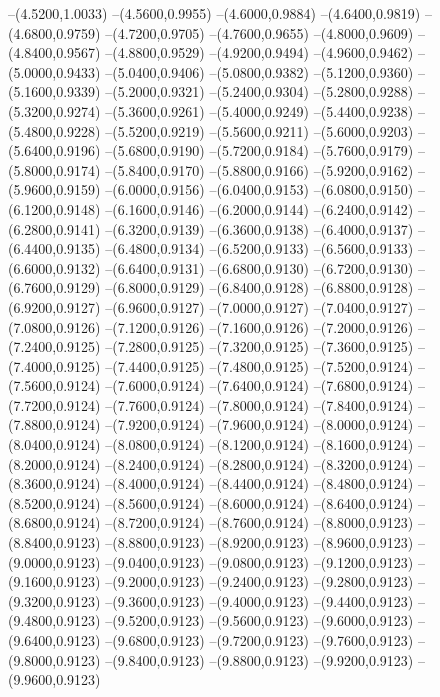 {	--(4.5200,1.0033)
	--(4.5600,0.9955)
	--(4.6000,0.9884)
	--(4.6400,0.9819)
	--(4.6800,0.9759)
	--(4.7200,0.9705)
	--(4.7600,0.9655)
	--(4.8000,0.9609)
	--(4.8400,0.9567)
	--(4.8800,0.9529)
	--(4.9200,0.9494)
	--(4.9600,0.9462)
	--(5.0000,0.9433)
	--(5.0400,0.9406)
	--(5.0800,0.9382)
	--(5.1200,0.9360)
	--(5.1600,0.9339)
	--(5.2000,0.9321)
	--(5.2400,0.9304)
	--(5.2800,0.9288)
	--(5.3200,0.9274)
	--(5.3600,0.9261)
	--(5.4000,0.9249)
	--(5.4400,0.9238)
	--(5.4800,0.9228)
	--(5.5200,0.9219)
	--(5.5600,0.9211)
	--(5.6000,0.9203)
	--(5.6400,0.9196)
	--(5.6800,0.9190)
	--(5.7200,0.9184)
	--(5.7600,0.9179)
	--(5.8000,0.9174)
	--(5.8400,0.9170)
	--(5.8800,0.9166)
	--(5.9200,0.9162)
	--(5.9600,0.9159)
	--(6.0000,0.9156)
	--(6.0400,0.9153)
	--(6.0800,0.9150)
	--(6.1200,0.9148)
	--(6.1600,0.9146)
	--(6.2000,0.9144)
	--(6.2400,0.9142)
	--(6.2800,0.9141)
	--(6.3200,0.9139)
	--(6.3600,0.9138)
	--(6.4000,0.9137)
	--(6.4400,0.9135)
	--(6.4800,0.9134)
	--(6.5200,0.9133)
	--(6.5600,0.9133)
	--(6.6000,0.9132)
	--(6.6400,0.9131)
	--(6.6800,0.9130)
	--(6.7200,0.9130)
	--(6.7600,0.9129)
	--(6.8000,0.9129)
	--(6.8400,0.9128)
	--(6.8800,0.9128)
	--(6.9200,0.9127)
	--(6.9600,0.9127)
	--(7.0000,0.9127)
	--(7.0400,0.9127)
	--(7.0800,0.9126)
	--(7.1200,0.9126)
	--(7.1600,0.9126)
	--(7.2000,0.9126)
	--(7.2400,0.9125)
	--(7.2800,0.9125)
	--(7.3200,0.9125)
	--(7.3600,0.9125)
	--(7.4000,0.9125)
	--(7.4400,0.9125)
	--(7.4800,0.9125)
	--(7.5200,0.9124)
	--(7.5600,0.9124)
	--(7.6000,0.9124)
	--(7.6400,0.9124)
	--(7.6800,0.9124)
	--(7.7200,0.9124)
	--(7.7600,0.9124)
	--(7.8000,0.9124)
	--(7.8400,0.9124)
	--(7.8800,0.9124)
	--(7.9200,0.9124)
	--(7.9600,0.9124)
	--(8.0000,0.9124)
	--(8.0400,0.9124)
	--(8.0800,0.9124)
	--(8.1200,0.9124)
	--(8.1600,0.9124)
	--(8.2000,0.9124)
	--(8.2400,0.9124)
	--(8.2800,0.9124)
	--(8.3200,0.9124)
	--(8.3600,0.9124)
	--(8.4000,0.9124)
	--(8.4400,0.9124)
	--(8.4800,0.9124)
	--(8.5200,0.9124)
	--(8.5600,0.9124)
	--(8.6000,0.9124)
	--(8.6400,0.9124)
	--(8.6800,0.9124)
	--(8.7200,0.9124)
	--(8.7600,0.9124)
	--(8.8000,0.9123)
	--(8.8400,0.9123)
	--(8.8800,0.9123)
	--(8.9200,0.9123)
	--(8.9600,0.9123)
	--(9.0000,0.9123)
	--(9.0400,0.9123)
	--(9.0800,0.9123)
	--(9.1200,0.9123)
	--(9.1600,0.9123)
	--(9.2000,0.9123)
	--(9.2400,0.9123)
	--(9.2800,0.9123)
	--(9.3200,0.9123)
	--(9.3600,0.9123)
	--(9.4000,0.9123)
	--(9.4400,0.9123)
	--(9.4800,0.9123)
	--(9.5200,0.9123)
	--(9.5600,0.9123)
	--(9.6000,0.9123)
	--(9.6400,0.9123)
	--(9.6800,0.9123)
	--(9.7200,0.9123)
	--(9.7600,0.9123)
	--(9.8000,0.9123)
	--(9.8400,0.9123)
	--(9.8800,0.9123)
	--(9.9200,0.9123)
	--(9.9600,0.9123)
}
